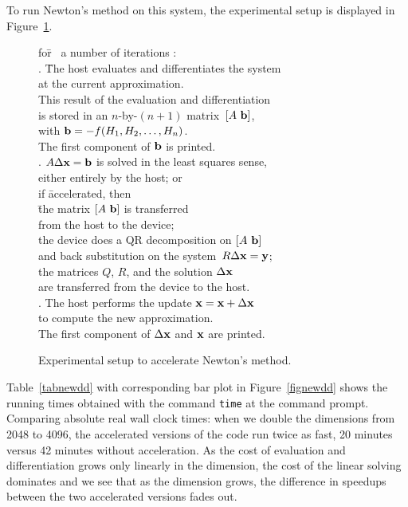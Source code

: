 \documentclass{article}
\newcommand\x{{\bf x}}
\newcommand\y{{\bf y}}
\newcommand\bfb{{\bf b}}
\begin{document}
To run Newton's method on this system, the experimental setup
is displayed in Figure~\ref{figsetupnew}.
\begin{figure}[hbt]
\begin{center}
\begin{tabbing}
for\= ~a number of iterations : \\
   . \= The host evaluates and differentiates the system \\
   \>    \> at the current approximation. \\
   \>    \> This result of the evaluation and differentiation \\
   \>    \> is stored in an $n$-by-$(n+1)$ matrix~$[A~\bfb]$, \\
   \>    \> with $\bfb = -f(H_1,H_2, \ldots, H_n)$. \\
   \>    \> The first component of $\bfb$ is printed. \\
   . \> $A \Delta \x = \bfb$ is solved 
            in the least squares sense, \\
   \>    \> either entirely by the host; or \\
   \>    \> if \= accelerated, then \\
   \>    \>     \= the matrix $[A~\bfb]$ is transferred \\
   \>    \>    \>     \> from the host to the device; \\
   \>    \>     the device does a QR decomposition on $[A~\bfb]$ \\
   \>    \>    \>     \> and back substitution on the 
                      system~$R \Delta \x = \y$;  \\
   \>    \>     the matrices $Q$, $R$, and the solution $\Delta \x$ \\
   \>    \>    \>     \> are transferred from the device to the host. \\
   . \>  The host performs the update $\x = \x + \Delta \x$ \\
   \>    \>  to compute the new approximation. \\
   \>    \>  The first component of $\Delta \x$ and $\x$ are printed.
\end{tabbing}
\caption{Experimental setup to accelerate Newton's method.}
\label{figsetupnew}
\end{center}
\end{figure}

Table~\ref{tabnewdd} with corresponding bar plot in Figure~\ref{fignewdd}
shows the running times obtained with the
command {\tt time} at the command prompt.
Comparing absolute real wall clock times: 
when we double the dimensions from 2048 to 4096,
the accelerated versions of the code run twice as fast,
20 minutes versus 42 minutes without acceleration.
As the cost of evaluation and differentiation grows only
linearly in the dimension, the cost of the linear solving
dominates and we see that as the dimension grows,
the difference in speedups between the two accelerated versions
fades out.
\end{document}

